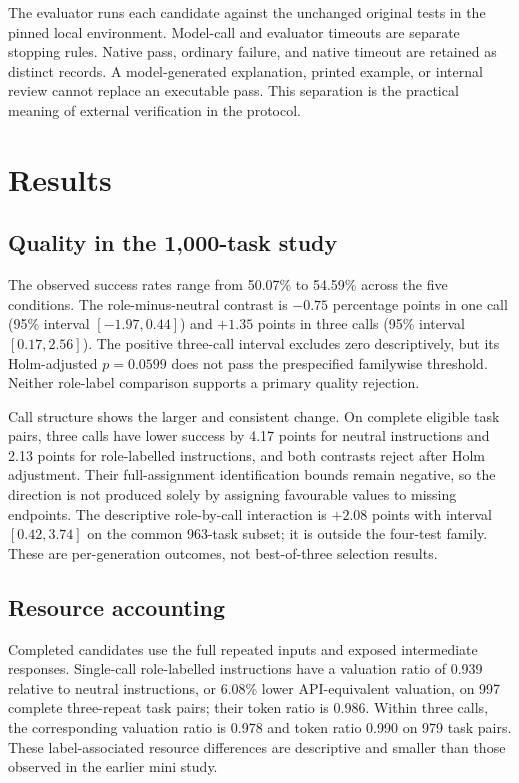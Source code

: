 The evaluator runs each candidate against the unchanged original tests in the pinned local environment. Model-call and evaluator timeouts are separate stopping rules. Native pass, ordinary failure, and native timeout are retained as distinct records. A model-generated explanation, printed example, or internal review cannot replace an executable pass. This separation is the practical meaning of external verification in the protocol.

\section{Results}
\subsection{Quality in the 1,000-task study}
The observed success rates range from 50.07\% to 54.59\% across the five conditions. The role-minus-neutral contrast is $-0.75$ percentage points in one call (95\% interval $[-1.97,0.44]$) and $+1.35$ points in three calls (95\% interval $[0.17,2.56]$). The positive three-call interval excludes zero descriptively, but its Holm-adjusted $p=0.0599$ does not pass the prespecified familywise threshold. Neither role-label comparison supports a primary quality rejection.

Call structure shows the larger and consistent change. On complete eligible task pairs, three calls have lower success by 4.17 points for neutral instructions and 2.13 points for role-labelled instructions, and both contrasts reject after Holm adjustment. Their full-assignment identification bounds remain negative, so the direction is not produced solely by assigning favourable values to missing endpoints. The descriptive role-by-call interaction is $+2.08$ points with interval $[0.42,3.74]$ on the common 963-task subset; it is outside the four-test family. These are per-generation outcomes, not best-of-three selection results.





\subsection{Resource accounting}
Completed candidates use the full repeated inputs and exposed intermediate responses. Single-call role-labelled instructions have a valuation ratio of 0.939 relative to neutral instructions, or 6.08\% lower API-equivalent valuation, on 997 complete three-repeat task pairs; their token ratio is 0.986. Within three calls, the corresponding valuation ratio is 0.978 and token ratio 0.990 on 979 task pairs. These label-associated resource differences are descriptive and smaller than those observed in the earlier mini study.

